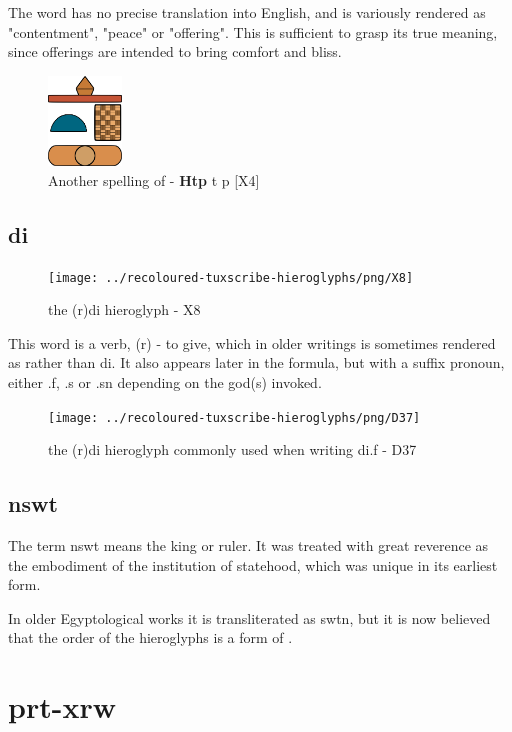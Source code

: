 The word  has no precise translation into English, and is variously rendered as "contentment", "peace" or "offering". This is sufficient to grasp its true meaning, since offerings are intended to bring comfort and bliss.

\begin{figure} [H]
	\centering
	\includegraphics[width=0.175\textwidth]{../images/htp2}
	\caption{Another spelling of  - \textbf{Htp} t p [X4]}
\end{figure}

\subsection*{di}

\begin{figure} [H]
	\centering
	\texttt{[image: ../recoloured-tuxscribe-hieroglyphs/png/X8]}
	\caption{the (r)di hieroglyph - X8}
\end{figure}

This word is a verb, (r) - to give, which in older writings is sometimes rendered as  rather than di. It also appears later in the formula, but with a suffix pronoun, either .f, .s or .sn depending on the god(s) invoked.

\begin{figure} [H]
	\centering
	\texttt{[image: ../recoloured-tuxscribe-hieroglyphs/png/D37]}
	\caption{the (r)di hieroglyph commonly used when writing di.f - D37}
\end{figure}

\subsection*{nswt}

The term nswt means the king or ruler. It was treated with great reverence as the embodiment of the institution of statehood, which was unique in its earliest form.

In older Egyptological works it is transliterated as swtn, but it is now believed that the order of the hieroglyphs is a form of .

\section*{prt-xrw}

